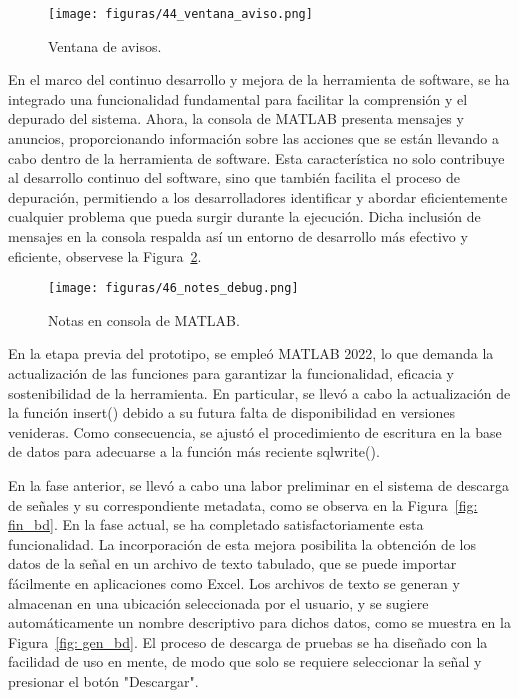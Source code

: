 \begin{figure}[H]
    \centering
    \texttt{[image: figuras/44\_ventana\_aviso.png]}
    \caption{Ventana de avisos.}
    \label{fig: avisos_toolbox}
\end{figure}

En el marco del continuo desarrollo y mejora de la herramienta de software, se ha integrado una funcionalidad fundamental para facilitar la comprensión y el depurado del sistema. Ahora, la consola de MATLAB presenta mensajes y anuncios, proporcionando información sobre las acciones que se están llevando a cabo dentro de la herramienta de software. Esta característica no solo contribuye al desarrollo continuo del software, sino que también facilita el proceso de depuración, permitiendo a los desarrolladores identificar y abordar eficientemente cualquier problema que pueda surgir durante la ejecución. Dicha inclusión de mensajes en la consola respalda así un entorno de desarrollo más efectivo y eficiente, observese la Figura~\ref{fig: debbug_matlab}.

\begin{figure}[H]
    \centering
    \texttt{[image: figuras/46\_notes\_debug.png]}
    \caption{Notas en consola de MATLAB.}
    \label{fig: debbug_matlab}
\end{figure}

En la etapa previa del prototipo, se empleó MATLAB 2022, lo que demanda la actualización de las funciones para garantizar la funcionalidad, eficacia y sostenibilidad de la herramienta. En particular, se llevó a cabo la actualización de la función insert() debido a su futura falta de disponibilidad en versiones venideras. Como consecuencia, se ajustó el procedimiento de escritura en la base de datos para adecuarse a la función más reciente sqlwrite().

En la fase anterior, se llevó a cabo una labor preliminar en el sistema de descarga de señales y su correspondiente metadata, como se observa en la Figura~\ref{fig: fin_bd}. En la fase actual, se ha completado satisfactoriamente esta funcionalidad. La incorporación de esta mejora posibilita la obtención de los datos de la señal en un archivo de texto tabulado, que se puede importar fácilmente en aplicaciones como Excel. Los archivos de texto se generan y almacenan en una ubicación seleccionada por el usuario, y se sugiere automáticamente un nombre descriptivo para dichos datos, como se muestra en la Figura~\ref{fig: gen_bd}. El proceso de descarga de pruebas se ha diseñado con la facilidad de uso en mente, de modo que solo se requiere seleccionar la señal y presionar el botón "Descargar".

